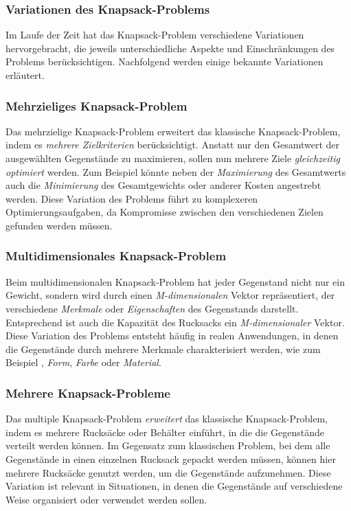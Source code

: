 \subsubsection{Variationen des Knapsack-Problems}
Im Laufe der Zeit hat das Knapsack-Problem verschiedene Variationen hervorgebracht, die jeweils unterschiedliche Aspekte
und Einschränkungen des Problems berücksichtigen. Nachfolgend werden einige bekannte Variationen erläutert.

\subsubsection*{Mehrzieliges Knapsack-Problem}
Das mehrzielige Knapsack-Problem erweitert das klassische Knapsack-Problem, indem es \textit{mehrere Zielkriterien}
berücksichtigt. Anstatt nur den Gesamtwert der ausgewählten Gegenstände zu maximieren, sollen nun mehrere Ziele \textit{gleichzeitig optimiert}
werden. Zum Beispiel könnte neben der \textit{Maximierung} des Gesamtwerts auch die \textit{Minimierung} des Gesamtgewichts
oder anderer Kosten angestrebt werden. Diese Variation des Problems führt zu komplexeren Optimierungsaufgaben, da
Kompromisse zwischen den verschiedenen Zielen gefunden werden müssen.

\subsubsection*{Multidimensionales Knapsack-Problem}
Beim multidimensionalen Knapsack-Problem hat jeder Gegenstand nicht nur ein Gewicht, sondern wird durch einen \textit{M-dimensionalen}
Vektor repräsentiert, der verschiedene \textit{Merkmale} oder \textit{Eigenschaften} des Gegenstands darstellt. Entsprechend
ist auch die Kapazität des Rucksacks ein \textit{M-dimensionaler} Vektor. Diese Variation des Problems entsteht häufig
in realen Anwendungen, in denen die Gegenstände durch mehrere Merkmale charakterisiert werden, wie zum Beispiel ,
\textit{Form}, \textit{Farbe} oder \textit{Material}.

\subsubsection*{Mehrere Knapsack-Probleme}
Das multiple Knapsack-Problem \textit{erweitert} das klassische Knapsack-Problem, indem es mehrere Rucksäcke oder Behälter
einführt, in die die Gegenstände verteilt werden können. Im Gegensatz zum klassischen Problem, bei dem alle Gegenstände in
einen einzelnen Rucksack gepackt werden müssen, können hier mehrere Rucksäcke genutzt werden, um die Gegenstände aufzunehmen.
Diese Variation ist relevant in Situationen, in denen die Gegenstände auf verschiedene Weise organisiert oder verwendet
werden sollen.

